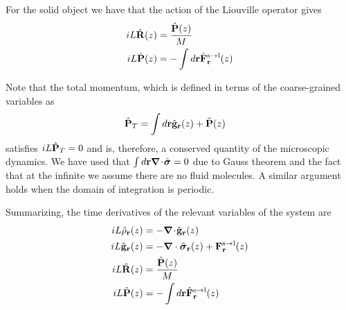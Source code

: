 \documentclass[a4paper,openright,12pt]{book}
\newcommand{\esc}{\!\cdot\!}
\begin{document}
For the solid object we have that the action of the Liouville operator gives
\begin{align}
    iL\hat{\bf R}(z) &=\frac{\hat{\bf P}(z)}{M}
  \nonumber\\
    iL\hat{\bf P}(z) &=-\int  d{\bf r} \hat{\bf F}^{\rm s\to l}_{\bf r}(z)
   \label{Pfsl}  
\end{align} 

Note  that the  total  momentum,  which is  defined  in  terms of  the
coarse-grained variables as
\begin{align}
  \hat{\bf P}_T&=\int d{\bf r} \hat{\bf g}_{\bf r}(z)+\hat{\bf P}(z)
\end{align}
satisfies $ iL\hat{\bf P}_T=0$ and is, therefore, a conserved quantity
of  the  microscopic   dynamics.   We  have  used   that  $\int  d{\bf
  r}\boldsymbol{\nabla}\esc\hat{\boldsymbol{\sigma}}=0$  due to  Gauss theorem  and the  fact
that at the infinite we assume there are no fluid molecules. A similar
argument holds when the domain of integration is periodic.


Summarizing, the time derivatives of the relevant variables of the system are
\begin{align}
    iL \hat{\rho}_{\bf r}(z) &= -\boldsymbol{\nabla}\esc\hat{\bf g}_{\bf r}(z)
\nonumber\\
iL\hat{\bf g}_{\bf r}(z)
&=-\boldsymbol{\nabla}\cdot \hat{\boldsymbol{\sigma}}_{\bf r}(z)+{\bf F}^{\rm s\to l}_{\bf r}(z) \nonumber \\
    iL\hat{\bf R}(z) &=\frac{\hat{\bf P}(z)}{M}
  \nonumber\\
    iL\hat{\bf P}(z) &=-\int  d{\bf r} \hat{\bf F}^{\rm s\to l}_{\bf r}(z)
   \label{timeDerivatives}  
\end{align}
\end{document}
